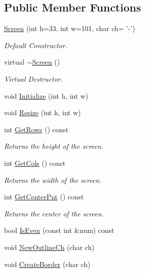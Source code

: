 \subsection*{Public Member Functions}
\begin{DoxyCompactItemize}
\item 
\hyperlink{classScreen_a932b81c3d221d644cc40ffe9003515a5}{Screen} (int h=33, int w=101, char ch= '-\/')
\begin{DoxyCompactList}\small\item\em Default Constructor. \end{DoxyCompactList}\item 
virtual \hyperlink{classScreen_a4243bc17596af96415b09ac48205676d}{$\sim$\-Screen} ()
\begin{DoxyCompactList}\small\item\em Virtual Destructor. \end{DoxyCompactList}\item 
void \hyperlink{classScreen_a455b38b1ac9b18bd67ecd2e056dff909}{Initialize} (int h, int w)
\item 
void \hyperlink{classScreen_a11f9842c836301989f7c3d84eb043700}{Resize} (int h, int w)
\item 
int \hyperlink{classScreen_aa12cc4ea36f5d2ac98b3c7334616acbc}{Get\-Rows} () const 
\begin{DoxyCompactList}\small\item\em Returns the height of the screen. \end{DoxyCompactList}\item 
int \hyperlink{classScreen_a223cd8821b2b8006c61545ff41aa0091}{Get\-Cols} () const 
\begin{DoxyCompactList}\small\item\em Returns the width of the screen. \end{DoxyCompactList}\item 
int \hyperlink{classScreen_a95daa612c5ec6a8018b89cfc2d785e27}{Get\-Center\-Pnt} () const 
\begin{DoxyCompactList}\small\item\em Returns the center of the screen. \end{DoxyCompactList}\item 
bool \hyperlink{classScreen_af7a18ec4e53fb371293e9ebcc23b7e2b}{Is\-Even} (const int \&num) const 
\item 
void \hyperlink{classScreen_a27dcfac6e64ab72059d0801dd9714d7a}{New\-Outline\-Ch} (char ch)
\item 
void \hyperlink{classScreen_a2ba1e54cb2fee7f246a25aed46c3ff3f}{Create\-Border} (char ch)

\end{DoxyCompactItemize}
